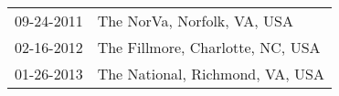 \begin{supertabular}{ll}
 09-24-2011 &       The NorVa, Norfolk, VA, USA \\
 02-16-2012 &  The Fillmore, Charlotte, NC, USA \\
 01-26-2013 &   The National, Richmond, VA, USA \\
\end{supertabular}
